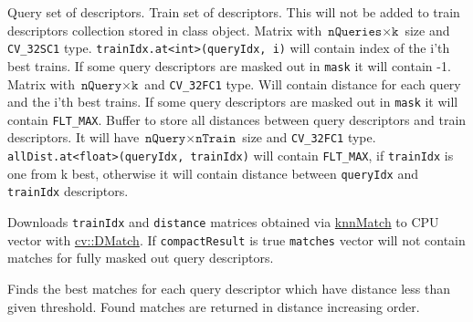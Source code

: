 \begin{description}
 {Query set of descriptors.}
 {Train set of descriptors. This will not be added to train descriptors collection stored in class object.}
 {Matrix with $\texttt{nQueries} \times \texttt{k}$ size and \texttt{CV\_32SC1} type. \texttt{trainIdx.at<int>(queryIdx, i)} will contain index of the i'th best trains. If some query descriptors are masked out in \texttt{mask} it will contain -1.}
 {Matrix with $\texttt{nQuery} \times \texttt{k}$ and \texttt{CV\_32FC1} type. Will contain distance for each query and the i'th best trains. If some query descriptors are masked out in \texttt{mask} it will contain \texttt{FLT\_MAX}.}
 {Buffer to store all distances between query descriptors and train descriptors. It will have $\texttt{nQuery} \times \texttt{nTrain}$ size and \texttt{CV\_32FC1} type. \texttt{allDist.at<float>(queryIdx, trainIdx)} will contain \texttt{FLT\_MAX}, if \texttt{trainIdx} is one from k best, otherwise it will contain distance between \texttt{queryIdx} and \texttt{trainIdx} descriptors.}
\end{description}


\label{cppfunc.gpu.BruteForceMatcher.knnMatchDownload}
Downloads \texttt{trainIdx} and \texttt{distance} matrices obtained via \hyperref[cppfunc.gpu.BruteForceMatcher.knnMatchSingle]{knnMatch} to CPU vector with \hyperref[cv.class.DMatch]{cv::DMatch}. If \texttt{compactResult} is true \texttt{matches} vector will not contain matches for fully masked out query descriptors.



\label{cppfunc.gpu.BruteForceMatcher.radiusMatch}
Finds the best matches for each query descriptor which have distance less than given threshold. Found matches are returned in distance increasing order.

